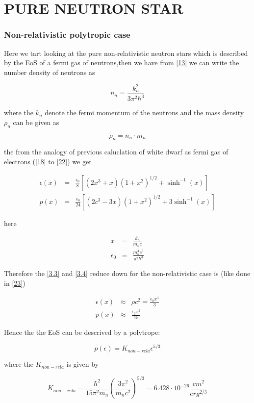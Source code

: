 \documentclass{report}
\begin{document}
\chapter{PURE NEUTRON STAR}
\subsection{Non-relativistic polytropic case}
Here we tart looking at the pure non-relativistic neutron stars which is described by the EoS of a fermi gas of neutrons,then we have from \ref{13} we can write the number density of neutrons as 
\begin{center}
\begin{equation}
n_n = \frac{k_n ^2}{3\pi ^2 \hbar ^3}
\label{3.1}
\end{equation}
\end{center}
where the $k_n$ denote the fermi momentum of the neutrons and the mass density $\rho_n$ can be given as 
\begin{center}
\begin{equation}
\rho_n = n_n \cdot m_n
\label{3.2}
\end{equation}
\end{center}
the from the analogy of previous caluclation of white dwarf as fermi gas of electrons (\ref{18} to \ref{22}) we get
\begin{center}
\begin{eqnarray}
\epsilon(x)&=& \frac{\epsilon_0}{8}\left[(2x^3+x)(1+x^2)^{1/2}+\sinh^{-1}(x)\right] \\
\label{3.3}
p(x) &=& \frac{\epsilon_0}{24}\left[ (2c^3-3x)(1+x^2)^{1/2}+3\sinh^{-1}(x)\right]
\label{3.4}
\end{eqnarray}
\end{center}
here 
\begin{center}
\begin{eqnarray}
x &=& \frac{k_n}{m_n c} \\
\label{3.5}
\epsilon_0 &=& \frac{m_n^4 c^5}{\pi^2\hbar ^3}
\label{3.6}
\end{eqnarray}
\end{center}
Therefore the \ref{3.3} and \ref{3.4} reduce down for the non-relativistic case is (like done in \ref{23})
\begin{center}
\begin{eqnarray}
\epsilon(x)&\approx& \rho c^2 = \frac{\epsilon_0 x^3}{3} \\
\label{3.7}
p(x) &\approx & \frac{\epsilon_0 x ^5}{15}
\label{3.8}
\end{eqnarray}
\end{center}
Hence the the EoS can be descrived by a polytrope:
\begin{center}
\begin{equation}
p(\epsilon)= K_{non-rela}\epsilon^{5/3}
\label{3.9}
\end{equation}
\end{center}
where the $K_{non-rela}$ is given by 
\begin{center}
\begin{equation}
K_{non-rela} = \frac{\hbar^2}{15\pi ^2 m_n}\left(\frac{3\pi^2 }{m_n c^2} \right)^{5/3}= 6.428 \cdot 10^{-26} \frac{cm^2}{erg^{2/3}}
\label{3.10}
\end{equation}
\end{center}
\end{document}
